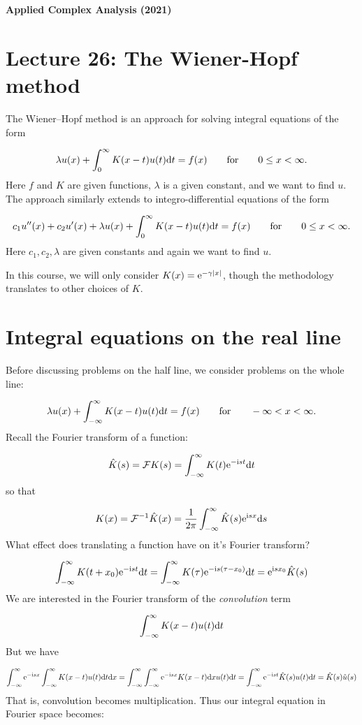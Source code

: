 \documentclass[12pt,a4paper]{article}
\def\qqfor{\qquad\hbox{for}\qquad}
\def\D{ {\rm d} }
\def\I{ {\rm i} }
\def\E{ {\rm e} }
\def\dx{\D x}
\def\dt{\D t}
\def\endash{–}
\begin{document}
\textbf{Applied Complex Analysis (2021)}

\section{Lecture 26: The Wiener-Hopf method}
The Wiener\ensuremath{\endash}Hopf method is an approach for solving integral equations of the form

\[
\lambda u(x) + \int_0^\infty K(x-t)u(t) \dt = f(x)\qqfor 0 \leq x < \infty.
\]
Here $f$ and $K$ are given functions, $\lambda$ is a given constant, and we want to find $u$. The approach similarly extends to integro-differential equations of the form

\[
c_1 u''(x) + c_2 u'(x) + \lambda u(x) + \int_0^\infty K(x-t)u(t) \dt = f(x)\qqfor 0 \leq x < \infty.
\]
Here $c_1, c_2, \lambda$ are given constants and again we want to find $u$.

In this course, we will only consider $K(x) = \E^{-\gamma |x|}$, though the methodology translates to other choices of $K$.

\section{Integral equations on the real line}
Before discussing problems on the half line, we consider problems on the whole line:

\[
\lambda u(x) + \int_{-\infty}^\infty K(x-t)u(t) \dt = f(x)\qqfor -\infty < x < \infty.
\]
Recall the Fourier transform of a function:

\[
    {\hat{K}}(s) = {\cal F} K (s) =  \int_{-\infty}^\infty K(t) \E^{-\I s t} \dt
\]
so that

\[
K(x) = {\cal F}^{-1} \hat K(x) =  {1 \over 2\pi}\int_{-\infty}^\infty \hat K(s) \E^{ \I s x} \D s
\]
What effect does translating a function have on it's Fourier transform?

\[
\int_{-\infty}^\infty K(t+x_0) \E^{-\I s t} \dt = \int_{-\infty}^\infty K(\tau) \E^{-\I s (\tau - x_0)} \dt = \E^{\I s x_0} \hat K(s)
\]
We are interested in the  Fourier transform of the \emph{convolution} term

\[
\int_{-\infty}^\infty K(x-t)u(t) \dt
\]
But we have

\[
\int_{-\infty}^\infty \E^{-\I s x} \int_{-\infty}^\infty K(x-t)u(t) \dt \dx = \int_{-\infty}^\infty \int_{-\infty}^\infty \E^{-\I s x} K(x-t)\dx u(t) \dt =
\int_{-\infty}^\infty \E^{-\I s t} \hat K(s) u(t) \dt = \hat K(s) \hat u(s)
\]
That is, convolution becomes multiplication. Thus our integral equation in Fourier space becomes:
\end{document}
